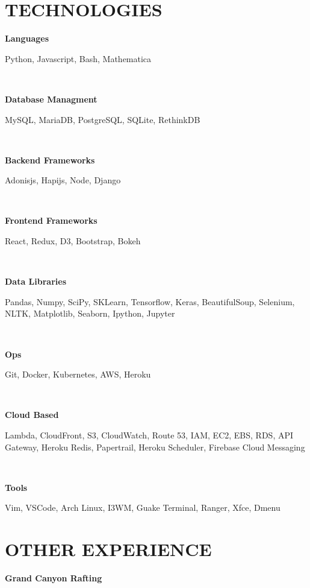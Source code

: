 \documentclass[12pt]{resume}
\begin{document}
    \hspace{5mm}
    \begin{minipage}[t]{0.48\textwidth}
        {\section* {TECHNOLOGIES}}
        { \par \bf Languages }
        { \par Python, Javascript, Bash, Mathematica}\\
        { \par \bf Database Managment }
        { \par MySQL, MariaDB, PostgreSQL, SQLite, RethinkDB}\\
        { \par \bf Backend Frameworks }
        { \par Adonisjs, Hapijs, Node, Django}\\
        { \par \bf Frontend Frameworks}
        { \par React, Redux, D3, Bootstrap, Bokeh}\\
        { \par \bf Data Libraries}
        { \par Pandas, Numpy, SciPy, SKLearn, Tensorflow, Keras, 
        BeautifulSoup, Selenium, NLTK, Matplotlib, Seaborn, Ipython, Jupyter}\\
        { \par \bf *Ops}
        { \par Git, Docker, Kubernetes, AWS, Heroku}\\
        { \par \bf Cloud Based}
        { \par Lambda, CloudFront, S3, CloudWatch, Route 53, IAM, EC2, EBS,
        RDS, API Gateway, Heroku Redis, Papertrail, Heroku Scheduler, Firebase
        Cloud Messaging}\\
        { \par \bf Tools }
        { \par Vim, VSCode, Arch Linux, I3WM, Guake Terminal, Ranger, Xfce,
        Dmenu}
        {\section* {OTHER EXPERIENCE}}
            {\par \bf Grand Canyon Rafting}
            \vspace{.05mm}
            \begin{itemize}

\end{itemize}
\end{minipage}
\end{document}
